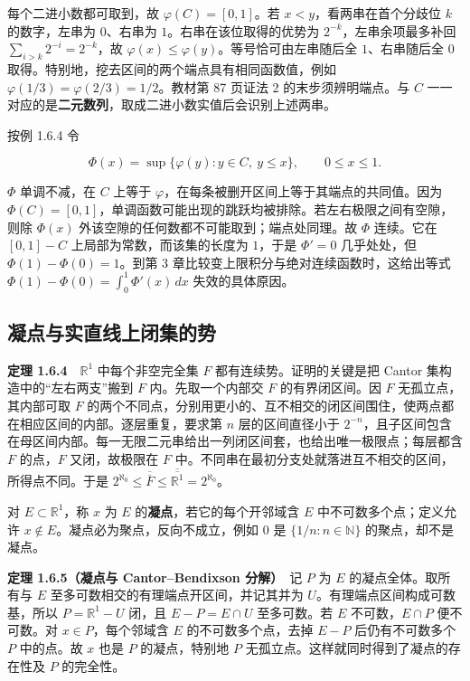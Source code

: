 \documentclass[11pt,a4paper]{article}
\begin{document}
每个二进小数都可取到，故 \(\varphi(C)=[0,1]\)。若 \(x<y\)，看两串在首个分歧位 \(k\) 的数字，左串为 \(0\)、右串为 \(1\)。右串在该位取得的优势为 \(2^{-k}\)，左串余项最多补回 \(\sum_{i>k}2^{-i}=2^{-k}\)，故 \(\varphi(x)\leq\varphi(y)\)。等号恰可由左串随后全 \(1\)、右串随后全 \(0\) 取得。特别地，挖去区间的两个端点具有相同函数值，例如 \(\varphi(1/3)=\varphi(2/3)=1/2\)。教材第 87 页证法 2 的末步须辨明端点。与 \(C\) 一一对应的是\textbf{二元数列}，取成二进小数实值后会识别上述两串。

按例 1.6.4 令

\[
\Phi(x)=\sup\{\varphi(y):y\in C,\ y\leq x\},\qquad 0\leq x\leq1.
\]

\(\Phi\) 单调不减，在 \(C\) 上等于 \(\varphi\)，在每条被删开区间上等于其端点的共同值。因为 \(\Phi(C)=[0,1]\)，单调函数可能出现的跳跃均被排除。若左右极限之间有空隙，则除 \(\Phi(x)\) 外该空隙的任何数都不可能取到；端点处同理。故 \(\Phi\) 连续。它在 \([0,1]-C\) 上局部为常数，而该集的长度为 \(1\)，于是 \(\Phi'=0\) 几乎处处，但 \(\Phi(1)-\Phi(0)=1\)。到第 3 章比较变上限积分与绝对连续函数时，这给出等式 \(\Phi(1)-\Phi(0)=\int_0^1\Phi'(x)\,dx\) 失效的具体原因。

\subsection{凝点与实直线上闭集的势}

\textbf{定理 1.6.4}　\(\mathbb R^1\) 中每个非空完全集 \(F\) 都有连续势。证明的关键是把 Cantor 集构造中的``左右两支''搬到 \(F\) 内。先取一个内部交 \(F\) 的有界闭区间。因 \(F\) 无孤立点，其内部可取 \(F\) 的两个不同点，分别用更小的、互不相交的闭区间围住，使两点都在相应区间的内部。逐层重复，要求第 \(n\) 层的区间直径小于 \(2^{-n}\)，且子区间包含在母区间内部。每一无限二元串给出一列闭区间套，也给出唯一极限点；每层都含 \(F\) 的点，\(F\) 又闭，故极限在 \(F\) 中。不同串在最初分支处就落进互不相交的区间，所得点不同。于是 \(2^{\aleph_0}\leq\overline{\overline F}\leq\overline{\overline{\mathbb R^1}}=2^{\aleph_0}\)。

对 \(E\subset\mathbb R^1\)，称 \(x\) 为 \(E\) 的\textbf{凝点}，若它的每个开邻域含 \(E\) 中不可数多个点；定义允许 \(x\notin E\)。凝点必为聚点，反向不成立，例如 \(0\) 是 \(\{1/n:n\in\mathbb N\}\) 的聚点，却不是凝点。

\textbf{定理 1.6.5（凝点与 Cantor--Bendixson 分解）}　记 \(P\) 为 \(E\) 的凝点全体。取所有与 \(E\) 至多可数相交的有理端点开区间，并记其并为 \(U\)。有理端点区间构成可数基，所以 \(P=\mathbb R^1-U\) 闭，且 \(E-P=E\cap U\) 至多可数。若 \(E\) 不可数，\(E\cap P\) 便不可数。对 \(x\in P\)，每个邻域含 \(E\) 的不可数多个点，去掉 \(E-P\) 后仍有不可数多个 \(P\) 中的点。故 \(x\) 也是 \(P\) 的凝点，特别地 \(P\) 无孤立点。这样就同时得到了凝点的存在性及 \(P\) 的完全性。
\end{document}
